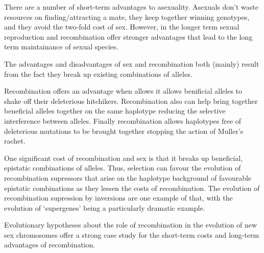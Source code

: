  

\begin{ChapterSummary}
\item There are a number of short-term advantages to asexuality. Asexuals don't waste resources on finding/attracting a mate, they keep together winning genotypes, and they avoid the two-fold cost of sex. However, in the longer term sexual reproduction and recombination offer stronger advantages that lead to the long term maintainance of sexual species. 
  
\item The advantages and disadvantages of sex and recombination both (mainly) result from the fact they break up existing combinations of alleles.

\item Recombination offers an advantage when allows it allows benificial alleles to shake off their deleterious hitchikers. Recombination also can help bring together beneficial alleles together on the same haplotype reducing the selective interference between alleles. Finally recombination allows haplotypes free of deleterious mutations to be brought together stopping the action of Muller's rachet.  

\item One significant cost of recombination and sex is that it breaks up beneficial, epistatic combinations of alleles. Thus, selection can favour the evolution of recombination supressors that arise on the haplotype background of favourable epistatic combinations as they lessen the costs of recombination. The evolution of recombination supression by inversions are one example of that, with the evolution of `supergenes' being a particularly dramatic example.   

\item Evolutionary hypotheses about the role of recombination in the evolution of new sex chromosomes offer a strong case study for the short-term costs and long-term advantages of recombination.

\end{ChapterSummary}